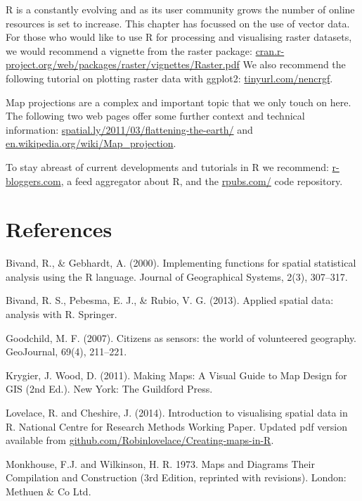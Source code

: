 \documentclass[]{article}
\begin{document}
R is a constantly evolving and as its user community grows the number of online resources is set to increase. 
This chapter has focussed on the use of vector data. For those who would like to use R for processing and visualising raster datasets,
we would recommend a vignette from the raster package:
\href{http://cran.r-project.org/web/packages/raster/vignettes/Raster.pdf}{cran.r-project.org/web/packages/raster/vignettes/Raster.pdf}
We also recommend the following tutorial on plotting raster data with ggplot2:
\href{http://nrelscience.org/2013/05/30/this-is-how-i-did-it-mapping-in-r-with-ggplot2/}{tinyurl.com/nencrgf}.

Map projections are a complex and important topic that we only touch on here. The following two web pages offer some further context and technical information:
\href{http://spatial.ly/2011/03/flattening-the-earth/}{spatial.ly/2011/03/flattening-the-earth/}
and \href{http://en.wikipedia.org/wiki/Map_projection}{en.wikipedia.org/wiki/Map\_projection}.


To stay abreast of current developments and tutorials in R we recommend:
\href{http://www.r-bloggers.com/}{r-bloggers.com}, a feed aggregator about R, and 
the \href{https://rpubs.com/}{rpubs.com/}
code repository.

\section{References}

Bivand, R., \& Gebhardt, A. (2000). Implementing functions for spatial
statistical analysis using the R language. Journal of Geographical
Systems, 2(3), 307--317.

Bivand, R. S., Pebesma, E. J., \& Rubio, V. G. (2013). Applied spatial
data: analysis with R. Springer.

Goodchild, M. F. (2007). Citizens as sensors: the world of volunteered
geography. GeoJournal, 69(4), 211--221.

Krygier, J. Wood, D. (2011). Making Maps: A Visual Guide to Map Design
for GIS (2nd Ed.). New York: The Guildford Press.

Lovelace, R. and Cheshire, J. (2014). Introduction to visualising
spatial data in R. National Centre for Research Methods Working Paper.
Updated pdf version available from
\href{https://github.com/Robinlovelace/Creating-maps-in-R}{github.com/Robinlovelace/Creating-maps-in-R}.

Monkhouse, F.J. and Wilkinson, H. R. 1973. Maps and Diagrams Their
Compilation and Construction (3rd Edition, reprinted with revisions).
London: Methuen \& Co Ltd.
\end{document}
